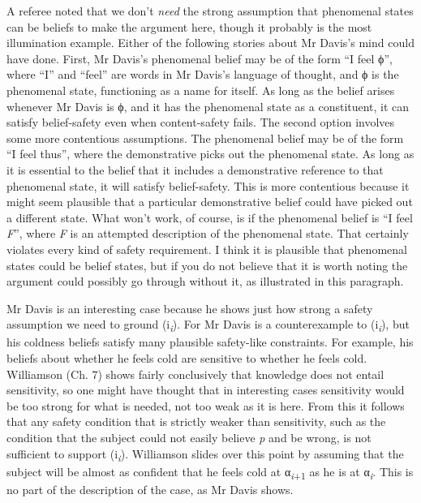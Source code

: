 \documentclass[
  11pt,
  letterpaper,
  DIV=11,
  numbers=noendperiod,
  twoside]{scrartcl}
\renewcommand{\textsc}[1]{{\scfont #1}}
\begin{document}
A referee noted that we don't \emph{need} the strong assumption that
phenomenal states can be beliefs to make the argument here, though it
probably is the most illumination example. Either of the following
stories about Mr Davis's mind could have done. First, Mr Davis's
phenomenal belief may be of the form ``I feel ϕ'', where ``I'' and
``feel'' are words in Mr Davis's language of thought, and ϕ is the
phenomenal state, functioning as a name for itself. As long as the
belief arises whenever Mr Davis is ϕ, and it has the phenomenal state as
a constituent, it can satisfy belief-safety even when content-safety
fails. The second option involves some more contentious assumptions. The
phenomenal belief may be of the form ``I feel thus'', where the
demonstrative picks out the phenomenal state. As long as it is essential
to the belief that it includes a demonstrative reference to that
phenomenal state, it will satisfy belief-safety. This is more
contentious because it might seem plausible that a particular
demonstrative belief could have picked out a different state. What won't
work, of course, is if the phenomenal belief is ``I feel \emph{F}'',
where \emph{F} is an attempted description of the phenomenal state. That
certainly violates every kind of safety requirement. I think it is
plausible that phenomenal states could be belief states, but if you do
not believe that it is worth noting the argument could possibly go
through without it, as illustrated in this paragraph.

Mr Davis is an interesting case because he shows just how strong a
safety assumption we need to ground
(\textsc{i}\textsubscript{\emph{i}}). For Mr Davis is a counterexample
to (\textsc{i}\textsubscript{\emph{i}}), but his coldness beliefs
satisfy many plausible safety-like constraints. For example, his beliefs
about whether he feels cold are sensitive to whether he feels cold.
Williamson (Ch. 7) shows fairly conclusively that knowledge does not
entail sensitivity, so one might have thought that in interesting cases
sensitivity would be too strong for what is needed, not too weak as it
is here. From this it follows that any safety condition that is strictly
weaker than sensitivity, such as the condition that the subject could
not easily believe \emph{p} and be wrong, is not sufficient to support
(\textsc{i}\textsubscript{\emph{i}}). Williamson slides over this point
by assuming that the subject will be almost as confident that he feels
cold at α\textsubscript{\emph{i}+1} as he is at
α\textsubscript{\emph{i}}. This is no part of the description of the
case, as Mr Davis shows.
\end{document}
